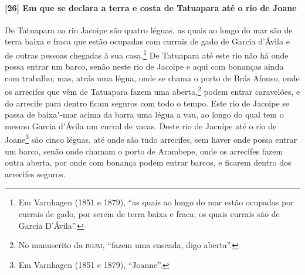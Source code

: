 \begin{linenumbers}
\paragraph{[26] Em que se declara a terra e costa de Tatuapara até o rio de Joane} \quad
De Tatuapara ao rio Jacoipe são quatro léguas, as quais ao longo do mar são de terra baixa
e fraca que estão ocupadas com currais de gado de Garcia d'Ávila e de outras pessoas
chegadas à sua casa.\footnote{ Em Varnhagen (1851 e 1879), ``as quais ao longo do mar
estão ocupadas por currais de gado, por serem de terra baixa e fraca; os quais currais são
de Garcia D'Ávila''.} De Tatuapara até este rio não há onde possa entrar um barco, senão
neste rio de Jacoipe e aqui com bonanças ainda com trabalho; mas, atrás uma légua, onde se
chama o porto de Brás Afonso, onde os arrecifes que vêm de Tatuapara fazem uma
aberta,\footnote{ No manuscrito da \textsc{bgjm}, ``fazem uma enseada, digo aberta''.}
podem entrar caravelões, e do arrecife para dentro ficam seguros com todo o tempo. Este
rio de Jacoipe se passa de baixa"-mar acima da barra uma légua a vau, ao longo do qual tem
o mesmo Garcia d'Ávila um curral de vacas. Deste rio de Jacuípe até o rio de
Joane\footnote{ Em Varnhagen (1851 e 1879), ``Joanne''.} são cinco léguas, até onde são
tudo arrecifes, sem haver onde possa entrar um barco, senão onde chamam o porto de
Arambepe, onde os arrecifes fazem outra aberta, por onde com bonança podem entrar barcos,
e ficarem dentro dos arrecifes seguros.


\end{linenumbers}
